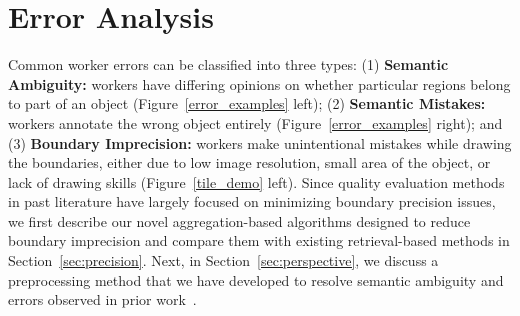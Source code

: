 \section{Error Analysis}
\par Common worker errors can be classified into three types: (1) \textbf{Semantic Ambiguity:} workers have differing opinions on whether particular regions belong to part of an object (Figure~\ref{error_examples} left); (2) \textbf{Semantic Mistakes:} workers annotate the wrong object entirely (Figure~\ref{error_examples} right); and (3) \textbf{Boundary Imprecision:} workers make unintentional mistakes while drawing the boundaries, either due to low image resolution, small area of the object, or lack of drawing skills (Figure~\ref{tile_demo} left).
Since quality evaluation methods in past literature have largely focused on minimizing boundary precision issues, we first describe our novel aggregation-based algorithms designed to reduce boundary imprecision and compare them with existing retrieval-based methods in Section~\ref{sec:precision}.%
Next, in Section~\ref{sec:perspective}, we discuss a preprocessing method that we have developed to resolve semantic ambiguity and errors observed in prior work~\cite{Sorokin2008,Lin2014,Gurari2018}. 
